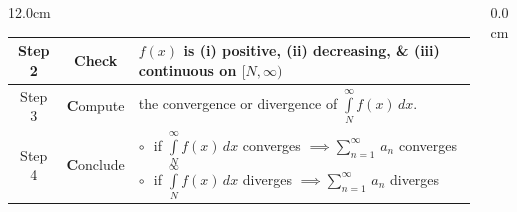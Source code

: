 \begin{frame}
\begin{columns}
\begin{column}{12.0cm}
\begin{tabular}{| c | c | p{7.6cm} |}
		\hline
	 	Step 2 & {\bf C}heck & $f(x)$ is (i) positive, (ii) decreasing, \& (iii) continuous on $[N,\infty)$\\
		\hline
		Step 3 & {\bf C}ompute & the convergence or divergence of $\int \limits_{N}^{\infty} f(x) \, dx$.\\
		\hline
		Step 4 & {\bf C}onclude & $\circ$\,\, if $\int \limits_{N}^{\infty} f(x) \, dx$ converges $\implies \sum \limits_{n=1}^{\infty}\, a_n$ converges \newline $\circ$\,\, if $\int \limits_{N}^{\infty} f(x) \, dx$ diverges $\implies \sum \limits_{n=1}^{\infty}\, a_n$ diverges  \\
		\hline
	\end{tabular}

\end{column}
\begin{column}{0.0cm}\end{column}
\end{columns}
\end{frame}

